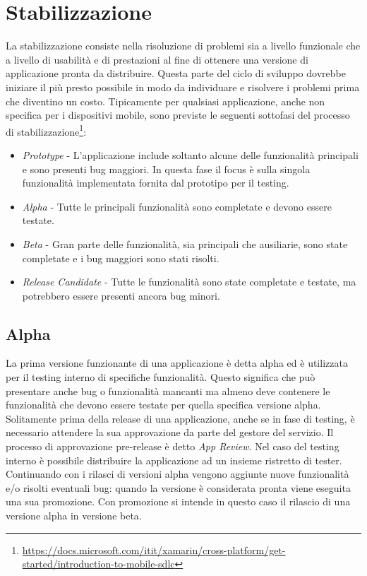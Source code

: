 \section{Stabilizzazione}
La stabilizzazione consiste nella risoluzione di problemi sia a livello funzionale che a livello di usabilità e di prestazioni al fine di ottenere una versione di applicazione pronta da distribuire. Questa parte del ciclo di sviluppo dovrebbe iniziare il più presto possibile in modo da individuare e risolvere i problemi prima che diventino un costo. Tipicamente per qualsiasi applicazione, anche non specifica per i dispositivi mobile, sono previste le seguenti sottofasi del processo di stabilizzazione\footnote{\href{https://docs.microsoft.com/itit/xamarin/cross-platform/get-started/introduction-to-mobile-sdlc}{https://docs.microsoft.com/itit/xamarin/cross-platform/get-started/introduction-to-mobile-sdlc}}:
\begin{itemize}
    \item \textit{Prototype} - L'applicazione include soltanto alcune delle funzionalità principali e sono presenti bug maggiori. In questa fase il focus è sulla singola funzionalità implementata fornita dal prototipo per il testing.
    \item \textit{Alpha} - Tutte le principali funzionalità sono completate e devono essere testate.
    \item \textit{Beta} - Gran parte delle funzionalità, sia principali che ausiliarie, sono state completate e i bug maggiori sono stati risolti.
    \item \textit{Release Candidate} - Tutte le funzionalità sono state completate e testate, ma potrebbero essere presenti ancora bug minori.
\end{itemize}

\subsection{Alpha}
La prima versione funzionante di una applicazione è detta alpha ed è utilizzata per il testing interno di specifiche funzionalità. Questo significa che può presentare anche bug o funzionalità mancanti ma almeno deve contenere le funzionalità che devono essere testate per quella specifica versione alpha.\\
Solitamente prima della release di una applicazione, anche se in fase di testing, è necessario attendere la sua approvazione da parte del gestore del servizio. Il processo di approvazione pre-release è detto \textit{App Review}. Nel caso del testing interno è possibile distribuire la applicazione ad un insieme ristretto di tester.\\
Continuando con i rilasci di versioni alpha vengono aggiunte nuove funzionalità e/o risolti eventuali bug: quando la versione è considerata pronta viene eseguita una sua promozione. Con promozione si intende in questo caso il rilascio di una versione alpha in versione beta.

